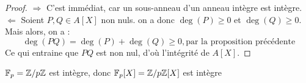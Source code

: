 \begin{proof}
	$\Rightarrow$ C'est immédiat, car un sous-anneau d'un anneau intègre est intègre.\\

	$\Leftarrow$
	Soient $P, Q \in A[X]$ non nuls. on a donc $\deg(P) \geqslant 0$ et $\deg(Q) \geqslant 0$.
	Mais alors, on a :
	$$ \deg(P Q)=\deg(P)+\deg(Q) \geqslant 0, \text{par la proposition précédente} $$
	Ce qui entraine que $P Q$ est non nul, d'où l'intégrité de $A[X]$.
\end{proof}

\begin{example}
	$\mathbb{F}_p=\mathbb{Z}/p\mathbb{Z}$ est intègre, donc $\mathbb{F}_p[X] = \mathbb{Z}/p\mathbb{Z}[X]$ est intègre
\end{example}
